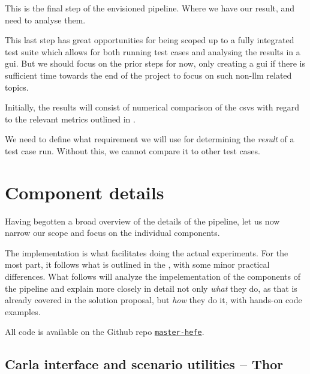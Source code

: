 This is the final step of the envisioned pipeline. Where we have our result, and
need to analyse them.

This last step has great opportunities for being scoped up to a fully integrated
test suite which allows for both running test cases and analysing the results in
a \acrfull{gui}. But we should focus on the prior steps for now, only creating a
\acrshort{gui} if there is sufficient time towards the end of the project to
focus on such non-\acrshort{llm} related topics.

Initially, the results will consist of numerical comparison of the
\acrshort{csv}s with regard to the relevant metrics outlined in
.

We need to define what requirement we will use for determining the \textit{result} of a test case
run. Without this, we cannot compare it to other test cases.

\section{Component details}

Having begotten a broad overview of the details of the \hefe pipeline, let us now narrow our scope
and focus on the individual components.



The implementation is what facilitates doing the actual experiments. For the
most part, it follows what is outlined in the , with
some minor practical differences.
What follows will analyze the impelementation of the components of the \hefe{}
pipeline and explain more closely in detail not only \emph{what} they do, as
that is already covered in the solution proposal, but \emph{how} they do it, with
hands-on code examples.

All code is available on the Github repo \href{https://github.com/orjahren/master-hefe}{\texttt{master-hefe}}.

\subsection{Carla interface and scenario utilities -- Thor}

